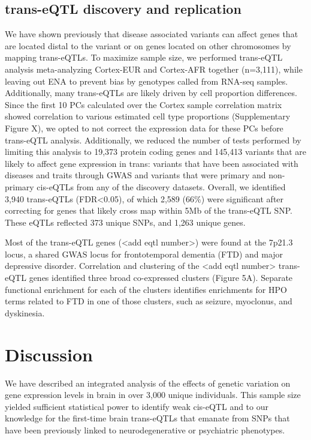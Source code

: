 \subsection{trans-eQTL discovery and replication}
We have shown previously that disease associated variants can affect genes that are located distal to the variant or on genes located on other chromosomes by mapping trans-eQTLs. To maximize sample size, we performed trans-eQTL analysis meta-analyzing Cortex-EUR and Cortex-AFR together (n=3,111), while leaving out ENA to prevent bias by genotypes called from RNA-seq samples. Additionally, many trans-eQTLs are likely driven by cell proportion differences. Since the first 10 PCs calculated over the Cortex sample correlation matrix showed correlation to various estimated cell type proportions (Supplementary Figure X), we opted to not correct the expression data for these PCs before trans-eQTL analysis. Additionally, we reduced the number of tests performed by limiting this analysis to 19,373 protein coding genes and 145,413 variants that are likely to affect gene expression in trans: variants that have been associated with diseases and traits through GWAS and variants that were primary and non-primary cis-eQTLs from any of the discovery datasets. Overall, we identified 3,940 trans-eQTLs (FDR<0.05), of which 2,589 (66\%) were significant after correcting for genes that likely cross map within 5Mb of the trans-eQTL SNP. These eQTLs reflected 373 unique SNPs, and 1,263 unique genes.  

Most of the trans-eQTL genes (<add eqtl number>) were found at the 7p21.3 locus, a shared GWAS locus for frontotemporal dementia (FTD) and major depressive disorder. Correlation and clustering of the <add eqtl number> trans-eQTL genes identified three broad co-expressed clusters (Figure 5A). Separate functional enrichment for each of the clusters identifies enrichments for HPO terms related to FTD in one of those clusters, such as seizure, myoclonus, and dyskinesia.  



\section{Discussion}

We have described an integrated analysis of the effects of genetic variation on gene expression levels in brain in over 3,000 unique individuals. This sample size yielded sufficient statistical power to identify weak cis-eQTL and to our knowledge for the first-time brain trans-eQTLs that emanate from SNPs that have been previously linked to neurodegenerative or psychiatric phenotypes. 



